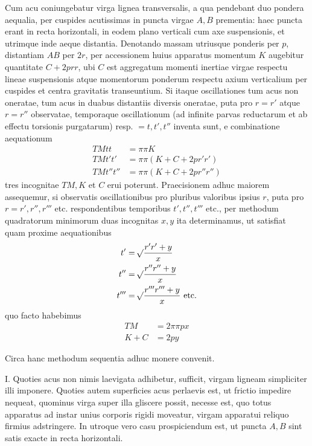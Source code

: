 Cum acu coniungebatur virga lignea transversalis, a qua pendebant duo pondera aequalia, per cuspides acutissimas in puncta virgae $A,B$ prementia: haec puncta erant in recta horizontali, in eodem plano verticali cum axe suspensionis, et utrimque inde aeque distantia. Denotando massam utriusque ponderis per $p$, distantiam $AB$ per $2r$, per accessionem huius apparatus momentum $K$ augebitur quantitate $C+2prr$, ubi $C$ est aggregatum momenti inertiae virgae respectu lineae suspensionis atque momentorum ponderum respectu axium verticalium per cuspides et centra gravitatis transeuntium. Si itaque oscillationes tum acus non oneratae, tum acus in duabus distantiis diversis oneratae, puta pro $r=r'$ atque $r=r''$ observatae, temporaque oscillationum (ad infinite parvas reductarum et ab effectu torsionis purgatarum) resp. $=t,t',t''$ inventa sunt, e combinatione aequationum
\[
\begin{aligned}
TMtt&=\pi\pi K\\
TMt't'&=\pi\pi(K+C+2pr'r')\\
TMt''t''&=\pi\pi(K+C+2pr''r'')
\end{aligned}
\]
tres incognitae $TM,K$ et $C$ erui poterunt. Praecisionem adhuc maiorem assequemur, si observatis oscillationibus pro pluribus valoribus ipsius $r$, puta pro $r=r',r'',r'''$ etc. respondentibus temporibus $t',t'',t'''$ etc., per methodum quadratorum minimorum duas incognitas $x,y$ ita determinamus, ut satisfiat quam proxime aequationibus
\[
\begin{aligned}
t'&=\mathord{{}^{}\!\surd}\frac{r'r'+y}{x}\\
t''&=\mathord{{}^{}\!\surd}\frac{r''r''+y}{x}\\
t'''&=\mathord{{}^{}\!\surd}\frac{r'''r'''+y}{x}\ \text{etc.}
\end{aligned}
\]
quo facto habebimus
\[
\begin{aligned}
TM&=2\pi\pi px\\
K+C&=2py
\end{aligned}
\]

Circa hanc methodum sequentia adhuc monere convenit.

I. Quoties acus non nimis laevigata adhibetur, sufficit, virgam ligneam simpliciter illi imponere. Quoties autem superficies acus perlaevis est, ut frictio impedire nequeat, quominus virga super illa gliscere possit, necesse est, quo totus apparatus ad instar unius corporis rigidi moveatur, virgam apparatui reliquo firmius adstringere. In utroque vero casu prospiciendum est, ut puncta $A,B$ sint satis exacte in recta horizontali.

